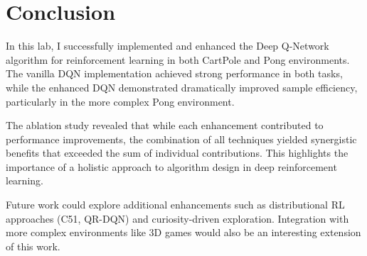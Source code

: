 \documentclass[a4paper]{article}
\begin{document}
\section{Conclusion}

In this lab, I successfully implemented and enhanced the Deep Q-Network algorithm for reinforcement learning in both CartPole and Pong environments. The vanilla DQN implementation achieved strong performance in both tasks, while the enhanced DQN demonstrated dramatically improved sample efficiency, particularly in the more complex Pong environment.

The ablation study revealed that while each enhancement contributed to performance improvements, the combination of all techniques yielded synergistic benefits that exceeded the sum of individual contributions. This highlights the importance of a holistic approach to algorithm design in deep reinforcement learning.

Future work could explore additional enhancements such as distributional RL approaches (C51, QR-DQN) and curiosity-driven exploration. Integration with more complex environments like 3D games would also be an interesting extension of this work.


\printbibliography
\end{document}

